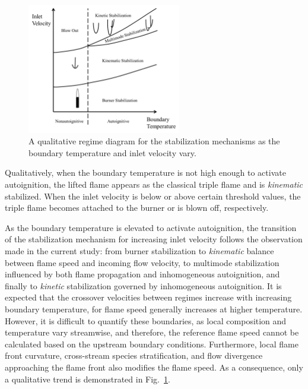\documentclass{wssci}
\begin{document}
\begin{figure}
  \centering
  \scriptsize
  \vspace{-0.1in}
  \includegraphics[width=0.6\textwidth]{2D-regime.png}
  \normalsize
  \vspace{-0.1in}
  \caption{A qualitative regime diagram for the stabilization mechanisms as the boundary temperature and inlet velocity vary. }
  \label{fig:2D-regime}
\end{figure}

Qualitatively, when the boundary temperature is not high enough to activate autoignition, the lifted flame appears as the classical triple flame and is \emph{kinematic} stabilized.  When the inlet velocity is below or above certain threshold values, the triple flame becomes attached to the burner or is blown off, respectively.  

As the boundary temperature is elevated to activate autoignition, the transition of the stabilization mechanism for increasing inlet velocity follows the observation made in the current study: from burner stabilization to \emph{kinematic} balance between flame speed and incoming flow velocity, to multimode stabilization influenced by both flame propagation and inhomogeneous autoignition, and finally to \emph {kinetic} stabilization governed by inhomogeneous autoignition.  It is expected that the crossover velocities between regimes increase with increasing boundary temperature, for flame speed generally increases at higher temperature.  However, it is difficult to quantify these boundaries, as local composition and temperature vary streamwise, and therefore, the reference flame speed cannot be calculated based on the upstream boundary conditions.  Furthermore, local flame front curvature, cross-stream species stratification, and flow divergence approaching the flame front also modifies the flame speed.  As a consequence, only a qualitative trend is demonstrated in Fig.~\ref{fig:2D-regime}.  
\end{document}

